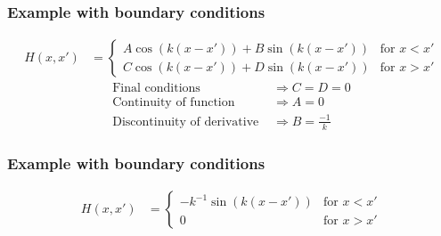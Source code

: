 \documentclass[12 pt, compress, handout, intlimits]{beamer}
\begin{document}
\begin{frame}[fragile]
    \frametitle{Example with boundary conditions}

    \begin{align*}
        H(x,x') &= 
            \begin{cases} 
                A \cos(k(x - x')) + B \sin(k(x - x')) & \text{for } x < x'
                \\
                C \cos(k(x - x')) + D \sin(k(x - x')) & \text{for } x > x'
            \end{cases}
    \end{align*}
    \begin{align*}
        \text{Final conditions } & \Longrightarrow C = D = 0
        \\
        \text{Continuity of function } & \Longrightarrow A = 0
        \\
        \text{Discontinuity of derivative } & \Longrightarrow B = \frac{-1}{k}
    \end{align*}
    
\end{frame}


\begin{frame}[fragile]
    \frametitle{Example with boundary conditions}

    \begin{align*}
        H(x,x') &= 
            \begin{cases} 
                - k^{-1} \sin(k (x - x')) & \text{for } x < x'
                \\
                0 & \text{for } x > x'
            \end{cases} 
    \end{align*}
 
\end{frame}
\end{document}
